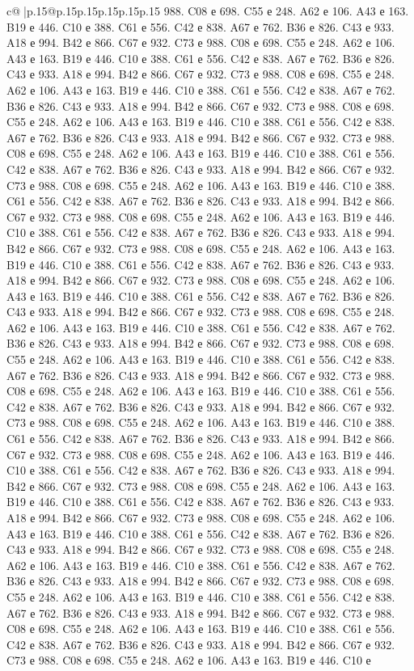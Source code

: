 \documentclass{article}
\begin{document}
{\begin{supertabular}{c@{$\;$}|p{.15\linewidth}@{}p{.15\linewidth}p{.15\linewidth}p{.15\linewidth}p{.15\linewidth}p{.15\linewidth}}
{{{988. C08 е 698. C55 е 248. A62 е 106. A43 е 163. B19 е 446. C10 е 388. C61 е 556. C42 е 838. A67 е 762. B36 е 826. C43 е 933. A18 е 994. B42 е 866. C67 е 932. C73 е 988. C08 е 698. C55 е 248. A62 е 106. A43 е 163. B19 е 446. C10 е 388. C61 е 556. C42 е 838. A67 е 762. B36 е 826. C43 е 933. A18 е 994. B42 е 866. C67 е 932. C73 е 988. C08 е 698. C55 е 248. A62 е 106. A43 е 163. B19 е 446. C10 е 388. C61 е 556. C42 е 838. A67 е 762. B36 е 826. C43 е 933. A18 е 994. B42 е 866. C67 е 932. C73 е 988. C08 е 698. C55 е 248. A62 е 106. A43 е 163. B19 е 446. C10 е 388. C61 е 556. C42 е 838. A67 е 762. B36 е 826. C43 е 933. A18 е 994. B42 е 866. C67 е 932. C73 е 988. C08 е 698. C55 е 248. A62 е 106. A43 е 163. B19 е 446. C10 е 388. C61 е 556. C42 е 838. A67 е 762. B36 е 826. C43 е 933. A18 е 994. B42 е 866. C67 е 932. C73 е 988. C08 е 698. C55 е 248. A62 е 106. A43 е 163. B19 е 446. C10 е 388. C61 е 556. C42 е 838. A67 е 762. B36 е 826. C43 е 933. A18 е 994. B42 е 866. C67 е 932. C73 е 988. C08 е 698. C55 е 248. A62 е 106. A43 е 163. B19 е 446. C10 е 388. C61 е 556. C42 е 838. A67 е 762. B36 е 826. C43 е 933. A18 е 994. B42 е 866. C67 е 932. C73 е 988. C08 е 698. C55 е 248. A62 е 106. A43 е 163. B19 е 446. C10 е 388. C61 е 556. C42 е 838. A67 е 762. B36 е 826. C43 е 933. A18 е 994. B42 е 866. C67 е 932. C73 е 988. C08 е 698. C55 е 248. A62 е 106. A43 е 163. B19 е 446. C10 е 388. C61 е 556. C42 е 838. A67 е 762. B36 е 826. C43 е 933. A18 е 994. B42 е 866. C67 е 932. C73 е 988. C08 е 698. C55 е 248. A62 е 106. A43 е 163. B19 е 446. C10 е 388. C61 е 556. C42 е 838. A67 е 762. B36 е 826. C43 е 933. A18 е 994. B42 е 866. C67 е 932. C73 е 988. C08 е 698. C55 е 248. A62 е 106. A43 е 163. B19 е 446. C10 е 388. C61 е 556. C42 е 838. A67 е 762. B36 е 826. C43 е 933. A18 е 994. B42 е 866. C67 е 932. C73 е 988. C08 е 698. C55 е 248. A62 е 106. A43 е 163. B19 е 446. C10 е 388. C61 е 556. C42 е 838. A67 е 762. B36 е 826. C43 е 933. A18 е 994. B42 е 866. C67 е 932. C73 е 988. C08 е 698. C55 е 248. A62 е 106. A43 е 163. B19 е 446. C10 е 388. C61 е 556. C42 е 838. A67 е 762. B36 е 826. C43 е 933. A18 е 994. B42 е 866. C67 е 932. C73 е 988. C08 е 698. C55 е 248. A62 е 106. A43 е 163. B19 е 446. C10 е 388. C61 е 556. C42 е 838. A67 е 762. B36 е 826. C43 е 933. A18 е 994. B42 е 866. C67 е 932. C73 е 988. C08 е 698. C55 е 248. A62 е 106. A43 е 163. B19 е 446. C10 е 388. C61 е 556. C42 е 838. A67 е 762. B36 е 826. C43 е 933. A18 е 994. B42 е 866. C67 е 932. C73 е 988. C08 е 698. C55 е 248. A62 е 106. A43 е 163. B19 е 446. C10 е 388. C61 е 556. C42 е 838. A67 е 762. B36 е 826. C43 е 933. A18 е 994. B42 е 866. C67 е 932. C73 е 988. C08 е 698. C55 е 248. A62 е 106. A43 е 163. B19 е 446. C10 е 388. C61 е 556. C42 е 838. A67 е 762. B36 е 826. C43 е 933. A18 е 994. B42 е 866. C67 е 932. C73 е 988. C08 е 698. C55 е 248. A62 е 106. A43 е 163. B19 е 446. C10 е 388. C61 е 556. C42 е 838. A67 е 762. B36 е 826. C43 е 933. A18 е 994. B42 е 866. C67 е 932. C73 е 988. C08 е 698. C55 е 248. A62 е 106. A43 е 163. B19 е 446. C10 е 388. C61 е 556. C42 е 838. A67 е 762. B36 е 826. C43 е 933. A18 е 994. B42 е 866. C67 е 932. C73 е 988. C08 е 698. C55 е 248. A62 е 106. A43 е 163. B19 е 446. C10 е }}}
\end{supertabular}}
\end{document}
